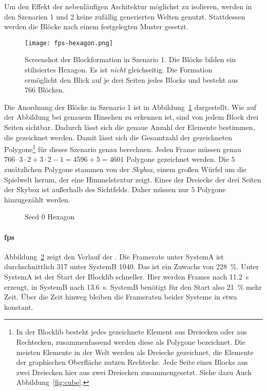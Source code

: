 
Um den Effekt der nebenläufigen Architektur möglichst zu isolieren, werden in den Szenarien 1 und 2 keine zufällig generierten Welten genutzt. Stattdessen werden die Blöcke nach einem festgelegten Muster gesetzt.

\begin{figure}
	\centering
	\texttt{[image: fps-hexagon.png]}
	\caption{Screenshot der Blockformation in Szenario 1. Die Blöcke bilden ein stilisiertes Hexagon. Es ist \emph{nicht} gleichseitig. Die Formation ermöglicht den Blick auf je drei Seiten jedes Blocks und besteht aus 766 Blöcken.}\label{fig:hexagon}
\end{figure}
Die Anordnung der Blöcke in Szenario 1 ist in Abbildung~\ref{fig:hexagon} dargestellt. Wie auf der Abbildung bei genauem Hinsehen zu erkennen ist, sind von jedem Block drei Seiten sichtbar. Dadurch lässt sich die genaue Anzahl der Elemente bestimmen, die gezeichnet werden. Damit lässt sich die Gesamtzahl der gezeichneten Polygone\footnote{In der Blocklib besteht jedes gezeichnete Element aus Dreiecken oder aus Rechtecken, zusammenfassend werden diese als Polygone bezeichnet. Die meisten Elemente in der Welt werden als Dreiecke gezeichnet, die Elemente der graphischen Oberfläche nutzen Rechtecke. Jede Seite eines Blocks aus zwei Dreiecken hier aus zwei Dreiecken zusammengesetzt. Siehe dazu Auch Abbildung~\ref{fig:cube}.} für dieses Szenario genau berechnen. Jeden Frame müssen genau $766\cdot3\cdot2 + 3\cdot2-1 = 4596 +5 = 4601$ Polygone gezeichnet werden. Die $5$ zusätzlichen Polygone stammen von der \emph{Skybox}, einem großen Würfel um die Spielwelt herum, der eine Himmelstextur zeigt. Eines der Dreiecke der drei Seiten der Skybox ist außerhalb des Sichtfelds. Daher müssen nur $5$ Polygone hinzugezählt werden.

\begin{figure}[!htbp]
	\caption{Seed 0 Hexagon}\label{fig:seed-0-hexagon-fps}
\end{figure}
\paragraph{\ac{fps}} Abbildung~\ref{fig:seed-0-hexagon-fps} zeigt den Verlauf der \si{\fps}. Die Framerate unter SystemA ist durchschnittlich \SI{317}{\fps} unter SystemB \SI{1040}{\fps}. Das ist ein Zuwachs von \SI{228}{\percent}. Unter SystemA ist der Start der Blocklib schneller. Hier werden Frames nach \SI{11,2}{\second} erzeugt, in SystemB nach \SI{13,6}{\second}. SystemB benötigt für den Start also \SI{21}{\percent} mehr Zeit. Über die Zeit hinweg bleiben die Frameraten beider Systeme in etwa konstant.


